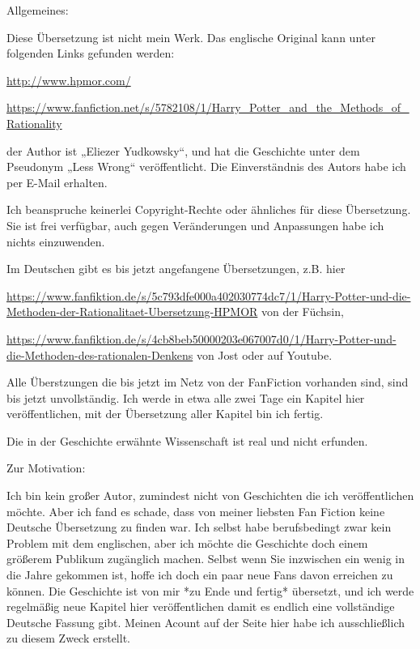 

\hypertarget{einfuxfchrung}{%

Allgemeines:

Diese Übersetzung ist nicht mein Werk. Das englische Original kann unter folgenden Links gefunden werden:

\url{http://www.hpmor.com/}\strut

\url{https://www.fanfiction.net/s/5782108/1/Harry_Potter_and_the_Methods_of_Rationality}\strut

der Author ist „Eliezer Yudkowsky“, und hat die Geschichte unter dem Pseudonym „Less Wrong“ veröffentlicht. Die Einverständnis des Autors habe ich per E-Mail erhalten.

Ich beanspruche keinerlei Copyright-Rechte oder ähnliches für diese Übersetzung. Sie ist frei verfügbar, auch gegen Veränderungen und Anpassungen habe ich nichts einzuwenden.

Im Deutschen gibt es bis jetzt angefangene Übersetzungen, z.B. hier

\url{https://www.fanfiktion.de/s/5c793dfe000a402030774dc7/1/Harry-Potter-und-die-Methoden-der-Rationalitaet-Ubersetzung-HPMOR} von der Füchsin,

\url{https://www.fanfiktion.de/s/4cb8beb50000203e067007d0/1/Harry-Potter-und-die-Methoden-des-rationalen-Denkens} von Jost oder auf Youtube.

Alle Überstzungen die bis jetzt im Netz von der FanFiction vorhanden sind, sind bis jetzt unvollständig. Ich werde in etwa alle zwei Tage ein Kapitel hier veröffentlichen, mit der Übersetzung aller Kapitel bin ich fertig.

Die in der Geschichte erwähnte Wissenschaft ist real und nicht erfunden.

Zur Motivation:

Ich bin kein großer Autor, zumindest nicht von Geschichten die ich veröffentlichen möchte. Aber ich fand es schade, dass von meiner liebsten Fan Fiction keine Deutsche Übersetzung zu finden war. Ich selbst habe berufsbedingt zwar kein Problem mit dem englischen, aber ich möchte die Geschichte doch einem größerem Publikum zugänglich machen. Selbst wenn Sie inzwischen ein wenig in die Jahre gekommen ist, hoffe ich doch ein paar neue Fans davon erreichen zu können. Die Geschichte ist von mir *zu Ende und fertig* übersetzt, und ich werde regelmäßig neue Kapitel hier veröffentlichen damit es endlich eine vollständige Deutsche Fassung gibt. Meinen Acount auf der Seite hier habe ich ausschließlich zu diesem Zweck erstellt.

}
